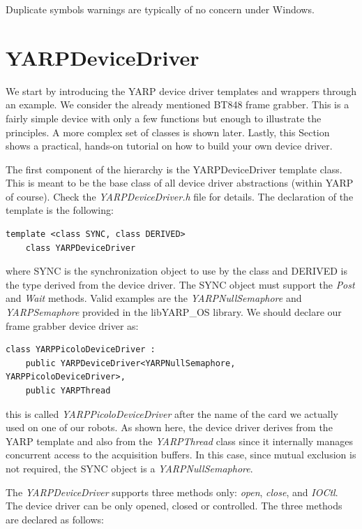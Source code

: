 Duplicate symbols warnings are typically of no concern under Windows.

\section{YARPDeviceDriver}

We start by introducing the YARP device driver templates and wrappers
through an example. We consider the already mentioned BT848 frame
grabber. This is a fairly simple device with only a few functions but
enough to illustrate the principles. A more complex set of classes is
shown later. Lastly, this Section shows a practical, hands-on tutorial
on how to build your own device driver.

The first component of the hierarchy is the YARPDeviceDriver template
class. This is meant to be the base class of all device driver
abstractions (within YARP of course). Check the {\em
YARPDeviceDriver.h} file for details. The declaration of the template
is the following:

\begin{verbatim}
template <class SYNC, class DERIVED> 
    class YARPDeviceDriver
\end{verbatim}

\noindent where SYNC is the synchronization object to use by the class
and DERIVED is the type derived from the device driver. The SYNC
object must support the {\em Post} and {\em Wait} methods. Valid
examples are the {\em YARPNullSemaphore} and {\em YARPSemaphore}
provided in the libYARP\_OS library. We should declare our frame
grabber device driver as:

\begin{verbatim}
class YARPPicoloDeviceDriver : 
    public YARPDeviceDriver<YARPNullSemaphore, YARPPicoloDeviceDriver>, 
    public YARPThread
\end{verbatim}

\noindent this is called {\em YARPPicoloDeviceDriver} after the name
of the card we actually used on one of our robots. As shown here, the
device driver derives from the YARP template and also from the {\em
YARPThread} class since it internally manages concurrent access to the
acquisition buffers. In this case, since mutual exclusion is not
required, the SYNC object is a {\em YARPNullSemaphore}.

The {\em YARPDeviceDriver} supports three methods only: {\em open},
{\em close}, and {\em IOCtl}. The device driver can be only opened,
closed or controlled. The three methods are declared as follows:

